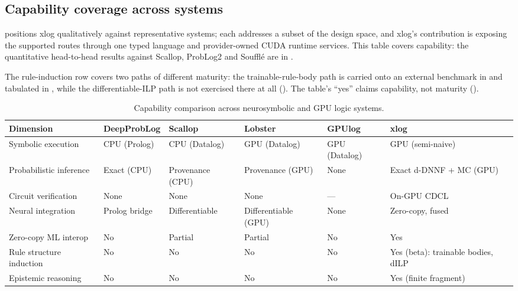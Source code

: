 \subsection{Capability coverage across systems}

 positions xlog qualitatively against representative systems; each addresses a subset of the design space, and xlog's contribution is exposing the supported routes through one typed language and provider-owned CUDA runtime services. This table covers capability: the quantitative head-to-head results against Scallop, ProbLog2 and Soufflé are in .

The rule-induction row covers two paths of different maturity: the trainable-rule-body path is carried onto an external benchmark in  and tabulated in , while the differentiable-ILP path is not exercised there at all (). The table's ``yes'' claims capability, not maturity ().

\begin{table}[htbp]
  \centering
  \caption{Capability comparison across neurosymbolic and GPU logic systems.}
  \label{tab:comparison}
  \small
  \begin{tabularx}{\linewidth}{@{}l L L L L L@{}}
    \toprule
    \textbf{Dimension} & \textbf{DeepProbLog} & \textbf{Scallop} & \textbf{Lobster} & \textbf{GPUlog} & \textbf{xlog} \\
    \midrule
    Symbolic execution      & CPU (Prolog) & CPU (Datalog)    & GPU (Datalog)      & GPU (Datalog) & GPU (semi-naive) \\
    Probabilistic inference & Exact (CPU)  & Provenance (CPU) & Provenance (GPU)   & None       & Exact d-DNNF + MC (GPU) \\
    Circuit verification    & None         & None             & None               & ---        & On-GPU CDCL \\
    Neural integration      & Prolog bridge & Differentiable  & Differentiable (GPU) & None     & Zero-copy, fused \\
    Zero-copy ML interop    & No           & Partial          & Partial            & No         & Yes \\
    Rule structure induction & No          & No               & No                 & No         & Yes (beta): trainable bodies, dILP \\
    Epistemic reasoning     & No           & No               & No                 & No         & Yes (finite fragment) \\
    \bottomrule
  \end{tabularx}
\end{table}

